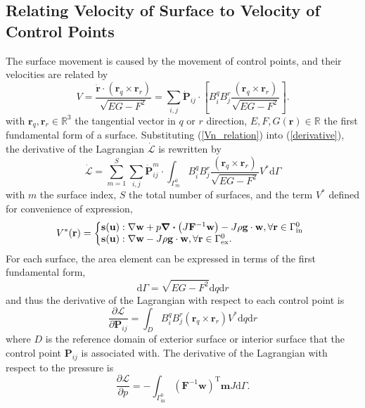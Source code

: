 \documentclass[journal]{IEEEtran}
\renewcommand{\vec}[1]{\mathbf{#1}}
\theoremstyle{definition}
\renewcommand{\vec}[1]{\mathbf{#1}}
\begin{document}
\subsection{Relating Velocity of Surface to Velocity of Control Points}
The surface movement is caused by the movement of control points, and their velocities are related by
\begin{equation} \label{Vn_relation}
  V =\frac{\dot{\mathbf{r}} \cdot (\mathbf{r}_q \times \mathbf{r}_r)}{\sqrt{EG-F^2}} = \sum_{i,j}{\mathbf{\dot{P}}_{ij}} \cdot \left[ B_i^q B_j^r \frac{ (\mathbf{r}_q \times \mathbf{r}_r)}{\sqrt{EG-F^2}}\right].
\end{equation}
with $\mathbf{r}_q, \mathbf{r}_r \in\mathbb{R}^3$ the tangential vector in $q$ or $r$ direction, $E,F,G(\vec{r})\in\mathbb{R}$ the first fundamental form of a surface. Substituting (\ref{Vn_relation}) into (\ref{derivative}), the derivative of the Lagrangian $\dot{\mathcal{L}}$ is rewritten by
\begin{equation}
  \dot{\mathcal{L}} = \sum_{m=1}^S \sum_{i,j}\mathbf{\dot{P}}_{ij}^m \cdot  \int_{\Gamma_m^0}  B_i^q B_j^r \frac{(\mathbf{r}_q \times \mathbf{r}_r)}{\sqrt{EG-F^2}}V^*\text{d} \Gamma
\end{equation}
with $m$ the surface index, $S$ the total number of surfaces, and the term $V^*$ defined for convenience of expression,
\begin{equation}\label{steepest}
  V^*(\vec{r})=  \left\{
  \begin{array}{@{}l@{}l}
     & \vec{s}(\vec{u}): \nabla\vec{w}+p\div\left(J\vec{F}^{-1}\vec{w}\right) - J\rho\mathbf{g}\cdot\mathbf{w}, \forall{\vec{r}}\in{\Gamma_{\text{in}}^0} \\
     & \vec{s}(\vec{u}): \nabla\vec{w} - J\rho\mathbf{g}\cdot\mathbf{w}, \forall{\vec{r}}\in{\Gamma_{\text {ex}}^0}.
  \end{array}
  \right.
\end{equation}
For each surface, the area element can be expressed in terms of the first fundamental form,
\begin{equation}
  \text{d} \Gamma = \sqrt{EG-F^2}\text{d}q\text{d}r
\end{equation}
and thus the derivative of the Lagrangian with respect to each control point is
\begin{equation} \label{derivation_CP}
  \frac{\partial \mathcal{L}}{\partial {\mathbf{P}}_{ij} }= \int_{D} B_i^q B_j^r (\mathbf{r}_q \times \mathbf{r}_r)V^* \text{d} q \text{d} r
\end{equation}
where $D$ is the reference domain of exterior surface or interior surface that the control point $\mathbf{P}_{ij}$ is associated with. The derivative of the Lagrangian with respect to the pressure is
\begin{equation} \label{derivation_pressure}
  \frac{\partial \mathcal{L}}{\partial p }= - \int_{\Gamma_{\text{in}}^{0}} (\vec{F}^{-1}\vec{w})^\text{T} \vec{m} J \mathrm{d} \Gamma.
\end{equation}
\end{document}
